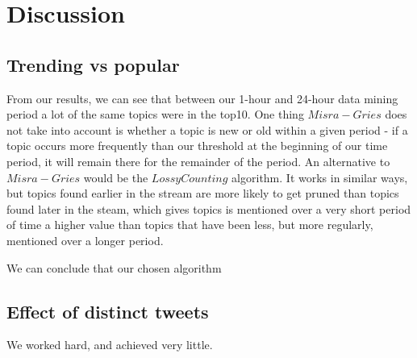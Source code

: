 \section{Discussion}\label{conclusions}

\subsection{Trending vs popular}\label{trending-discussion}

From our results, we can see that between our 1-hour and 24-hour data mining period a lot of the same topics were in the top10. One thing $Misra-Gries$ does not take into account is whether a topic is new or old within a given period - if a topic occurs more frequently than our threshold at the beginning of our time period, it will remain there for the remainder of the period. An alternative to $Misra-Gries$ would be the $Lossy Counting$ algorithm. It works in similar ways, but topics found earlier in the stream are more likely to get pruned than topics found later in the steam, which gives topics is mentioned over a very short period of time a higher value than topics that have been less, but more regularly, mentioned over a longer period.

We can conclude that our chosen algorithm 

\subsection{Effect of distinct tweets}\label{trending-distinct}

We worked hard, and achieved very little.